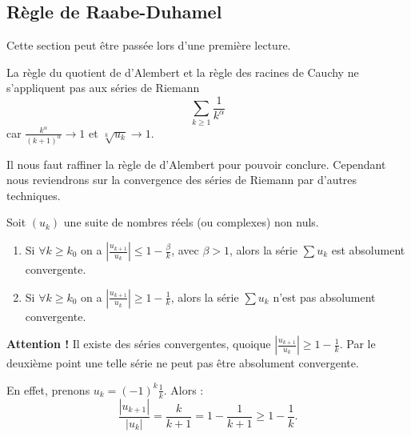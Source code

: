 \documentclass[class=report,crop=false]{standalone}
\begin{document}
\subsection{Règle de Raabe-Duhamel}

Cette section peut être passée lors d'une première lecture.

\medskip


La règle du quotient de d'Alembert et la règle des racines de Cauchy 
ne s'appliquent pas aux séries de Riemann  
$$\sum_{k\ge1} \frac{1}{k^\alpha}$$
car $\frac{k^\alpha}{(k+1)^\alpha}\to 1$
et $\sqrt[k]{u_k} \to 1$.

Il nous faut raffiner la règle de d'Alembert
pour pouvoir conclure. Cependant nous reviendrons 
sur la convergence des séries de Riemann par d'autres techniques.



\begin{theoreme}
Soit $(u_k)$ une suite de nombres réels (ou complexes) non nuls.
\begin{enumerate}
  \item Si $\forall k\geq k_0$ on a 
  $\left|\frac{u_{k+1}}{u_k}\right|\le 1-\frac{\beta}{k}$, avec $\beta>1$,
alors la série $\sum u_k$ est absolument convergente.
  \item Si $\forall k\geq k_0$ on a 
  $\left|\frac{u_{k+1}}{u_k}\right|\ge 1-\frac{1}{k}$, alors
 la série $\sum u_k$ n'est  pas absolument convergente.
\end{enumerate}
\end{theoreme}

\textbf{Attention !}
Il existe des séries convergentes, 
quoique $\left|\frac{u_{k+1}}{u_k}\right|\ge 1-\frac{1}{k}$.
Par le deuxième point une telle série ne peut pas être 
absolument convergente.

En effet, prenons $u_k=(-1)^k \frac{1}{k}$. Alors :
$$\frac{|u_{k+1}|}{|u_k|}= \frac{k}{k+1}= 1-\frac{1}{k+1}\ge 1-\frac{1}{k}.$$
\end{document}
